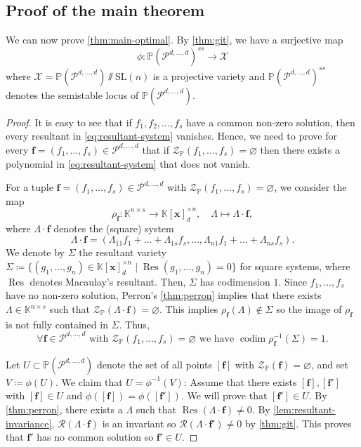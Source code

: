 \documentclass[11pt,a4paper]{article}
\numberwithin{equation}{section}
\newcommand{\PP}{\mathbb{P}}
\newcommand{\KK}{\mathbb{K}}
\newcommand{\cR}{\mathcal{R}}
\newcommand{\cX}{\mathcal{X}}
\newcommand{\cP}{\mathcal{P}}
\newcommand{\cZ}{\mathcal{Z}}
\newcommand{\xx}{\ensuremath{\boldsymbol{x}}}
\newcommand{\ff}{\ensuremath{\boldsymbol{f}}}
\newcommand{\SL}{\mathrm{SL}}
\DeclareMathOperator{\codim}{codim}
\DeclareMathOperator{\Res}{Res}
\begin{document}
\subsection{Proof of the main theorem}
\label{sec:proof-main}
We can now prove \cref{thm:main-optimal}.
By \cref{thm:git}, we have a surjective map \[
\phi:\PP(\cP^{d,\dots,d})^{ss}\rightarrow \cX 
\] where $\cX=\PP(\cP^{d,\dots,d})\sslash \SL(n)$ is a projective variety and $\PP(\cP^{d,\dots,d})^{ss}$ denotes the semistable locus of $\PP(\cP^{d,\dots,d})$.

\mainthm*

\begin{proof}
It is easy to see that if $f_1,f_2,\dots,f_s$ have a common non-zero solution, then every resultant in \eqref{eq:resultant-system} vanishes. 
Hence, we need to prove for every $\ff=(f_1,\dots,f_s)\in\cP^{d,\dots,d}$ that if $\cZ_{\PP}(f_1,\dots,f_s)=\varnothing$ then there exists a polynomial in \eqref{eq:resultant-system} that does not vanish.

For a tuple $\ff=(f_1,\dots,f_s)\in\cP^{d,\dots,d}$ with $\cZ_{\PP}(f_1,\dots,f_s)=\varnothing$, we consider the map \[
\rho_{\ff} : \KK^{n\times s}\rightarrow \KK[\xx]_d^{\times n},\quad \Lambda\mapsto \Lambda \cdot \ff,
\] where $\Lambda\cdot \ff$ denotes the (square) system \[
\Lambda\cdot \ff = (\Lambda_{11}f_1+\dots+\Lambda_{1s}f_s, \dots, \Lambda_{n1}f_1+\dots+\Lambda_{ns}f_s).
\]
We denote by $\Sigma$ the resultant variety $\Sigma\coloneqq \{(g_1,\dots,g_n)\in\KK[\xx]_d^{\times n}\mid \Res(g_1,\dots,g_n)=0\}$ for square systems, where $\Res$ denotes Macaulay's resultant.
Then, $\Sigma$ has codimension $1$.
Since $f_1,\dots,f_s$ have no non-zero solution, Perron's \cref{thm:perron} implies that there exists $\Lambda\in\KK^{n\times s}$ such that $\cZ_{\PP}(\Lambda\cdot\ff)=\varnothing$.
This implies $\rho_{\ff}(\Lambda)\not\in\Sigma$ so the image of $\rho_{\ff}$ is not fully contained in $\Sigma$.
Thus, 
\begin{equation}
\label{eq:codim}
\forall \ff\in\cP^{d,\dots,d} \text{ with }\cZ_{\PP}(f_1,\dots,f_s)=\varnothing\text{ we have } \codim \rho_{\ff}^{-1}(\Sigma)=1.
\end{equation}

Let $U\subset\PP(\cP^{d,\dots,d})$ denote the set of all points $[\ff]$ with $\cZ_{\PP}(\ff)=\varnothing$, and set $V\coloneqq \phi(U)$.
We claim that $U=\phi^{-1}(V)$:
Assume that there exists $[\ff],[\ff']$ with $[\ff]\in U$ and $\phi([\ff])=\phi([\ff'])$.
We will prove that $[\ff']\in U$.
By \cref{thm:perron}, there exists a $\Lambda$ such that $\Res(\Lambda\cdot \ff)\neq 0$.
By \cref{lem:resultant-invariance}, $\cR(\Lambda\cdot\ff)$ is an invariant so $\cR(\Lambda\cdot\ff')\neq 0$ by \cref{thm:git}.
This proves that $\ff'$ has no common solution so $\ff'\in U$.


\end{proof}
\end{document}
